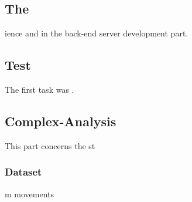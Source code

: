 \documentclass[14pt]{extarticle}
\def\sp{\vspace{5pt}}
\def\ss{\vspace{25pt}}
\begin{document}
\newpage
\begin{center}
	\section{The}
	\sp
\end{center}
\begin{flushleft}
ience and in the back-end server development part. 
	\ss
\end{flushleft}

\subsection{Test}
\sp
\begin{flushleft}
The first task was .
\end{flushleft}

\subsection{Complex-Analysis} \label{complex}
\sp
\begin{flushleft}
This part concerns the st
\subsubsection{Dataset }
m movements
\end{flushleft}
\end{document}
